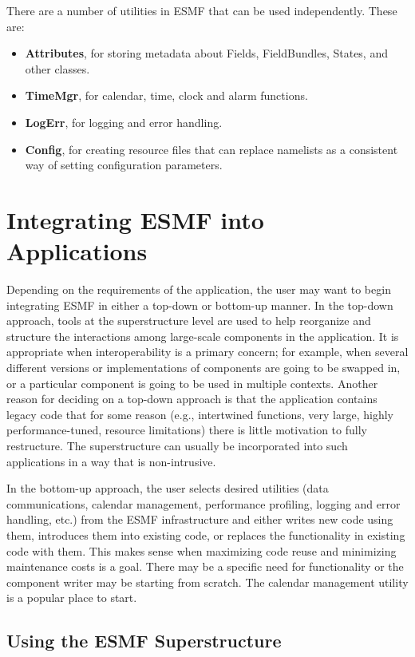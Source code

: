 There are a number of utilities in ESMF that can be used independently.
These are:
\begin{itemize}
\item {\bf Attributes}, for storing metadata about Fields,
FieldBundles, States, and other classes.
\item {\bf TimeMgr}, for calendar, time, clock and alarm functions.
\item {\bf LogErr}, for logging and error handling.
\item {\bf Config}, for creating resource files that can replace namelists
as a consistent way of setting configuration parameters.
\end{itemize}

\section{Integrating ESMF into Applications}

Depending on the requirements of the application, the user may 
want to begin integrating ESMF in either a top-down or bottom-up 
manner.  In the top-down approach, tools at the superstructure 
level are used to help reorganize and structure the interactions
among large-scale components in the application.  It is appropriate
when interoperability is a primary concern; for example, when 
several different versions or implementations of components are going 
to be swapped in, or a particular component is going to be used 
in multiple contexts.  Another reason for deciding on a top-down 
approach is that the application contains legacy code that for 
some reason (e.g., intertwined functions, very large,
highly performance-tuned, resource limitations) there is little 
motivation to fully restructure.  The superstructure can usually be 
incorporated into such applications in a way that is non-intrusive.

In the bottom-up approach, the user selects desired utilities 
(data communications, calendar management, performance profiling,
logging and error handling, etc.) from the ESMF infrastructure 
and either writes new code using them, introduces them into 
existing code, or replaces the functionality in existing code 
with them.  This makes sense when maximizing code reuse and 
minimizing maintenance costs is a goal.  There may be a specific
need for functionality or the component writer may be starting
from scratch.  The calendar management utility is a popular
place to start.

\subsection{Using the ESMF Superstructure}


